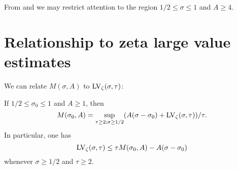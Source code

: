 From  and  we may restrict attention to the region $1/2 \leq \sigma \leq 1$ and $A \geq 4$.

\section{Relationship to zeta large value estimates}

We can relate $M(\sigma,A)$ to $\mathrm{LV}_\zeta(\sigma,\tau)$:

\begin{lemma}\label{mad}  If $1/2 \leq \sigma_0 \leq 1$ and $A \geq 1$, then
\begin{equation}\label{M-form}
 M(\sigma_0,A) = \sup_{\tau \geq 2; \sigma \geq 1/2} (A(\sigma-\sigma_0) + \mathrm{LV}_\zeta(\sigma,\tau))/\tau.
\end{equation}
In particular, one has
$$ \mathrm{LV}_\zeta(\sigma,\tau) \leq \tau M(\sigma_0,A) - A(\sigma-\sigma_0)$$
whenever $\sigma \geq 1/2$ and $\tau \geq 2$.
\end{lemma}

